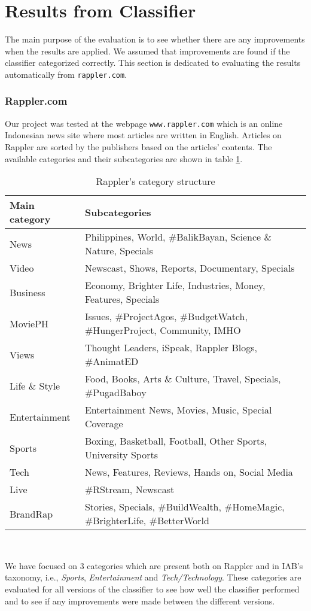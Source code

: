 \section{Results from Classifier}
\label{sec:results_from_classifier}
The main purpose of the evaluation is to see whether there are any improvements when the results are applied. We assumed that improvements are found if the classifier categorized correctly. This section is dedicated to evaluating the results automatically from \texttt{rappler.com}.


\subsubsection{Rappler.com}
Our project was tested at the webpage \texttt{www.rappler.com} which is an online Indonesian news site where most articles are written in English. Articles on Rappler are sorted by the publishers based on the articles' contents. The available categories and their subcategories are shown in table \ref{tab:rapplercontent}.

\begin{table}[ht]
\centering
\renewcommand{\arraystretch}{1.25}
\begin{tabularx}{\textwidth}{l|  X }
\textbf{Main category} & \textbf{Subcategories} \\ \hline
News & Philippines, World, \#BalikBayan, Science \& Nature, Specials \\ \hline
Video & Newscast, Shows, Reports, Documentary, Specials \\ \hline
Business & Economy, Brighter Life, Industries, Money, Features, Specials \\ \hline
MoviePH & Issues, \#ProjectAgos, \#BudgetWatch, \#HungerProject, Community, IMHO \\ \hline
Views & Thought Leaders, iSpeak, Rappler Blogs, \#AnimatED \\ \hline
Life \& Style & Food, Books, Arts \& Culture, Travel, Specials, \#PugadBaboy \\ \hline
Entertainment & Entertainment News, Movies, Music, Special Coverage \\ \hline
Sports & Boxing, Basketball, Football, Other Sports, University Sports\\ \hline
Tech & News, Features, Reviews, Hands on, Social Media \\ \hline
Live & \#RStream, Newscast \\ \hline
BrandRap & Stories, Specials, \#BuildWealth, \#HomeMagic, \#BrighterLife, \#BetterWorld
\end{tabularx}
\\[10pt]
\caption{Rappler's category structure}
\label{tab:rapplercontent}
\end{table}
We have focused on 3 categories which are present both on Rappler and in IAB's taxonomy, i.e., \emph{Sports}, \emph{Entertainment} and \emph{Tech/Technology}. These categories are evaluated for all versions of the classifier to see how well the classifier performed and to see if any improvements were made between the different versions. 

